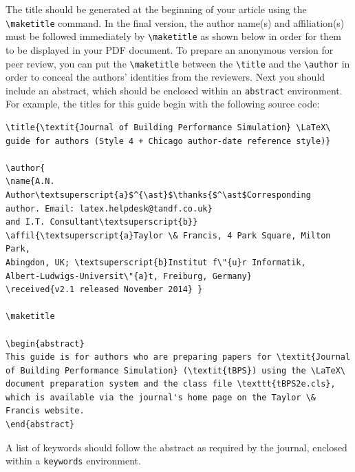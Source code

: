 \documentclass{tBPS2e}
\theoremstyle{plain}
\theoremstyle{definition}
\theoremstyle{remark}
\begin{document}
The title should be generated at the beginning of your article using the \verb"\maketitle" command.
In the final version, the author name(s) and affiliation(s) must be followed immediately by \verb"\maketitle" as shown below in order for them to be displayed in your PDF document.
To prepare an anonymous version for peer review, you can put the \verb"\maketitle" between the \verb"\title" and the \verb"\author" in order to conceal the authors' identities from the reviewers.
Next you should include an abstract, which should be enclosed within an \texttt{abstract} environment.
For example, the titles for this guide begin with the following source code:
\begin{verbatim}
\title{\textit{Journal of Building Performance Simulation} \LaTeX\
guide for authors (Style 4 + Chicago author-date reference style)}

\author{
\name{A.N. Author\textsuperscript{a}$^{\ast}$\thanks{$^\ast$Corresponding
author. Email: latex.helpdesk@tandf.co.uk}
and I.T. Consultant\textsuperscript{b}}
\affil{\textsuperscript{a}Taylor \& Francis, 4 Park Square, Milton Park,
Abingdon, UK; \textsuperscript{b}Institut f\"{u}r Informatik,
Albert-Ludwigs-Universit\"{a}t, Freiburg, Germany}
\received{v2.1 released November 2014} }

\maketitle

\begin{abstract}
This guide is for authors who are preparing papers for \textit{Journal
of Building Performance Simulation} (\textit{tBPS}) using the \LaTeX\
document preparation system and the class file \texttt{tBPS2e.cls},
which is available via the journal's home page on the Taylor \&
Francis website.
\end{abstract}
\end{verbatim}
A list of keywords should follow the abstract as required by the journal, enclosed within a \texttt{keywords} environment.
\end{document}
